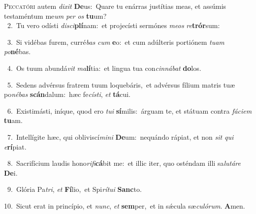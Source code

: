 \lettrine{\initial\textcolor{\initialcolor}{P}}{eccatóri} autem \textit{di}\-\textit{xit} \textbf{De}\-us:~\star Quare tu enárras justítias meas, et assúmis testaméntum me\textit{um} \textit{per} \textit{os} \textbf{tu}\-um?\\
{\numbfont\textcolor{\numbcolor}{~2.}}~Tu vero odísti \textit{di}\-\textit{sci}\textbf{plí}nam:~\star et projecísti sermónes \textit{me}\-\textit{os} \textit{re}\-\textbf{trór}sum:\par
{\numbfont\textcolor{\numbcolor}{~3.}}~Si vidébas furem, curré\textit{bas} \textit{cum} \textbf{e}\-o:~\star et cum adúlteris portiónem \textit{tu}\-\textit{am} \textit{po}\-\textbf{né}bas.\par
{\numbfont\textcolor{\numbcolor}{~4.}}~Os tuum abundá\textit{vit} \textit{ma}\-\textbf{lí}tia:~\star et lingua tua con\-\textit{cin}\-\textit{ná}\textit{bat} \textbf{do}\-los.\par
{\numbfont\textcolor{\numbcolor}{~5.}}~Sedens advérsus fratrem tuum loquebáris,~\dagger et advérsus fílium matris tuæ po\-\textit{né}\-\textit{bas} \textbf{scán}\-dalum:~\star hæc fe\-\textit{cís}\-\textit{ti}, \textit{et} \textbf{tá}\-cui.\par
{\numbfont\textcolor{\numbcolor}{~6.}}~Existimásti, iníque, quod ero \textit{tu}\-\textit{i} \textbf{sí}\-milis:~\star árguam te, et státuam contra \textit{fá}\-\textit{ci}\textit{em} \textbf{tu}\-am.\par
{\numbfont\textcolor{\numbcolor}{~7.}}~Intellígite hæc, qui obliviscí\-\textit{mi}\-\textit{ni} \textbf{De}\-um:~\star nequándo rápiat, et non \textit{sit} \textit{qui} \textit{e}\-\textbf{rí}piat.\par
{\numbfont\textcolor{\numbcolor}{~8.}}~Sacrifícium laudis hono\-\textit{ri}\-\textit{fi}\textbf{cá}bit me:~\star et illic iter, quo osténdam illi sa\-\textit{lu}\-\textit{tá}\textit{re} \textbf{De}\-i.\par
{\numbfont\textcolor{\numbcolor}{~9.}}~Glória Pa\-\textit{tri}\-, \textit{et} \textbf{Fí}\-lio,~\star et Spi\-\textit{rí}\-\textit{tu}\textit{i} \textbf{Sanc}\-to.\par
{\numbfont\textcolor{\numbcolor}{10.}}~Sicut erat in princípio, et \textit{nunc}\-, \textit{et} \textbf{sem}\-per,~\star et in sǽcula sæ\-\textit{cu}\-\textit{ló}\textit{rum}. \textbf{A}\-men.\par
